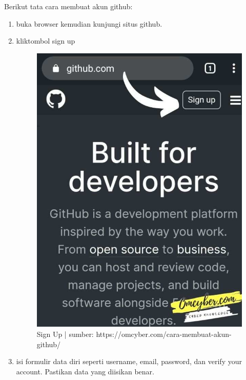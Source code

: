 Berikut tata cara membuat akun github:
\begin{enumerate}
\item buka browser kemudian kunjungi situs github.
\item kliktombol sign up
\begin{figure}[H]
\centering
\includegraphics[scale=.25]{figures/daftar}
\caption{Sign Up | sumber: https://omcyber.com/cara-membuat-akun-github/}
\label{git2}
\end{figure}
\item isi formulir data diri seperti username, email, password, dan verify your account. Pastikan data yang diisikan benar.
\begin{figure}[H]
\centering

\end{figure}
\end{enumerate}
